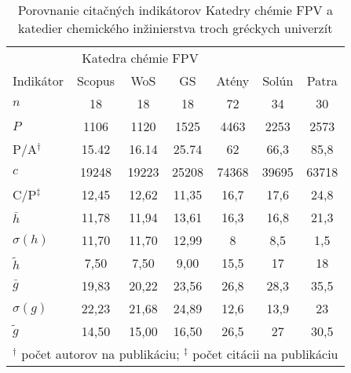 {\begin{SCtable}
  \label{tab:kazakis.results}
\centering\small
  \caption[Porovnanie Katedry chémie a katedier chemického inžinierstva troch gréckych univerzít]
  {Porovnanie citačných indikátorov Katedry chémie FPV a katedier chemického inžinierstva troch gréckych univerzít \citep{Kazakis2015}}
\begin{tabular}{lcccccc}
\toprule\noalign{\vspace{.3ex}}
           & \multicolumn{3}{c}{Katedra chémie FPV} & \multicolumn{3}{c}{\citet{Kazakis2015}}  \\
 Indikátor & Scopus & WoS   & GS    &  Atény     & Solún      & Patra      \\[0.3ex]
\midrule\noalign{\vspace{.5ex}}
 $n$         & 18     & 18    & 18    & 72    & 34    & 30    \\
 $P$         & 1106   & 1120  & 1525  & 4463  & 2253  & 2573  \\
 P/A$^\dagger$         & 15.42  & 16.14 & 25.74 & 62    & 66,3  & 85,8  \\
 $c$         & 19248  & 19223 & 25208 & 74368 & 39695 & 63718 \\
 C/P$^\ddagger$         & 12,45  & 12,62 & 11,35 & 16,7  & 17,6  & 24,8  \\[1ex]
 $\bar{h}$   & 11,78  & 11,94 & 13,61 & 16,3  & 16,8  & 21,3  \\
 $\sigma (h)$ & 11,70  & 11,70 & 12,99 & 8     & 8,5   & 1,5   \\
 $\tilde{h}$ & 7,50   & 7,50  & 9,00  & 15,5  & 17    & 18    \\
 $\bar{g}$   & 19,83  & 20,22 & 23,56 & 26,8  & 28,3  & 35,5  \\
 $\sigma (g)$  & 22,23  & 21,68 & 24,89 & 12,6  & 13,9  & 23    \\
 $\tilde{g}$  & 14,50  & 15,00 & 16,50 & 26,5  & 27    & 30,5  \\[0.5ex]
\bottomrule
  \multicolumn{7}{l}{\footnotesize $^\dagger$ počet autorov na publikáciu; $^\ddagger$ počet citácii na publikáciu} \\
\end{tabular}
\end{SCtable}

}
